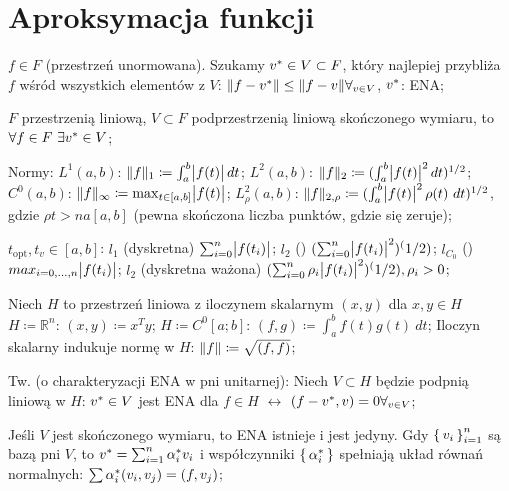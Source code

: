 \section{Aproksymacja funkcji}

\entry
$f \in F$
(przestrzeń unormowana).
Szukamy
$v^{*} \in V \subset F$,
który najlepiej przybliża $f$ wśród wszystkich elementów z $V$:
$\|f - v^{*}\| \leq \|f-v\| \forall_{v \in V}$,
$v^{*}$: ENA;

\entry
$F$ przestrzenią liniową, 
$V \subset F$ podprzestrzenią liniową skończonego wymiaru, to
$\forall{f \in F} \ \exists{\enain{v}{V}}$;

\entry
Normy:
\subentry
$L^1(a,b)$: 
$\|f\|_1 \coloneqq \int^b_a\abs{f(t)} dt$;
\subentry
$L^2(a,b)$: 
$\|f\|_2 \coloneqq (\int^b_a\abs{f(t)}^2 dt)^{1/2}$;
\subentry
$C^0(a,b)$: 
$\|f\|_\infty \coloneqq \max_{t \in [a,b]} \abs{f(t)}$;
\subentry
$L^2_\rho(a,b)$: 
$\|f\|_{2, \rho} \coloneqq (\int^b_a\abs{f(t)}^2 \rho(t) \ dt)^{1/2}$,
gdzie
$\rho t > na [a,b]$
(pewna skończona liczba punktów, gdzie się zeruje);


\entry
$t_{\text{opt}}, t_v \in [a,b]$:
\subentry
$l_1$ (dyskretna)
$\sum^n_{i=0} \abs{f(t_i)}$;
\subentry
$l_2$ (\dittotikz)
$(\sum^n_{i=0} \abs{f(t_i)}^2)^(1/2)$;
\subentry
$l_{C_0}$ (\dittotikz)
$max_{i = 0,\ldots,n} \abs{f(t_i)}$;
\subentry
$l_2$ (dyskretna ważona)
$(\sum^n_{i=0} \rho_i\abs{f(t_i)}^2)^(1/2), \rho_i>0$;

\entry
Niech $H$ to przestrzeń liniowa z iloczynem skalarnym 
$(x,y)$ dla $x, y \in H$
\subentry
$H \coloneqq \mathbb{R}^n$:
$(x,y) \coloneqq x^T y$;
\subentry
$H \coloneqq C^0[a;b]$:
$(f,g) \coloneqq \int^b_a f(t)g(t) \ dt$;
\subentry
Iloczyn skalarny indukuje normę w $H$:
$\|f\| \coloneqq \sqrt{(f,f)}$;

\entry
Tw. (o charakteryzacji ENA w pni unitarnej):
Niech $V \subset H$ będzie podpnią liniową w $H$:
$v^{*} \in V$ jest ENA dla $f \in H$
$\leftrightarrow$
$(f - v^{*}, v) = 0 \forall_{v \in V}$;

\entry
Jeśli $V$ jest skończonego wymiaru, to ENA istnieje i jest jedyny.
Gdy $\set{v_i}^n_{i=1}$ są bazą pni $V$, to
$v^{*} = \sum^n_{i=1} \alpha^{*}_i v_i$
i współczynniki $\set{\alpha^{*}_i}$
spełniają układ równań normalnych:
$\sum \alpha^{*}_i (v_i, v_j) = (f, v_j)$;

